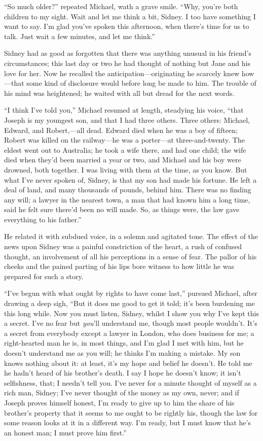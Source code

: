 ``So much older?'' repeated Michael, wath a grave smile. ``Why, you're
both children to my sight. Wait and let me think a bit, Sidney. I too
have something I want to say. I'm glad you've spoken this afternoon,
when there's time for us to talk. Just wait a few minutes, and let me
think.''

{\protect\hypertarget{126}{}{}}Sidney had as good as forgotten that
there was anything unusual in his friend's circumstances; this last day
or two he had thought of nothing but Jane and his love for her. Now he
recalled the anticipation---originating he scarcely knew how---that some
kind of disclosure would before long be made to him. The trouble of his
mind was heightened; he waited with all but dread for the next words.

``I think I've told you,'' Michael resumed at length, steadying his
voice, ``that Joseph is my youngest son, and that I had three others.
Three others: Michael, Edward, and Robert,---all dead. Edward died when
he was a boy of fifteen; Robert was killed on the railway---he was a
porter---at three-and-twenty. The eldest went out to Australia; he took
a wife there, and had one child; the wife died when they'd been married
a year or two, and Michael and his boy were drowned, both together. I
was living with them at the time, as you know. But what I've never
spoken of, Sidney, is that my son had made his fortune. He left a deal
of land, and many thousands of {\protect\hypertarget{127}{}{}}pounds,
behind him. There was no finding any will; a lawyer in the nearest town,
a man that had known him a long time, said he felt sure there'd been no
will made. So, as things were, the law gave everything to his father.''

He related it with subdued voice, in a solemn and agitated tone. The
effect of the news upon Sidney was a painful constriction of the heart,
a rush of confused thought, an involvement of all his perceptions in a
sense of fear. The pallor of his cheeks and the pained parting of his
lips bore witness to how little he was prepared for such a story.

``I've begun with what ought by rights to have come last,'' pursued
Michael, after drawing a deep sigh, ``But it does me good to get it
told; it's been burdening me this long while. Now you must listen,
Sidney, whilst I show you why I've kept this a secret. I've no fear but
\emph{you}'ll understand me, though most people wouldn't. It's a secret
from everybody except a lawyer in London, who does business for me; a
right-hearted man {\protect\hypertarget{128}{}{}}he is, in most things,
and I'm glad I met with him, but he doesn't understand me as you will;
he thinks I'm making a mistake. My son knows nothing about it: at least,
it's my hope and belief he doesn't. He told me he hadn't heard of his
brother's death. I say I hope he doesn't know; it isn't selfishness,
that; I needn't tell you. I've never for a minute thought of myself as a
rich man, Sidney; I've never thought of the money as my own, never; and
if Joseph proves himself honest, I'm ready to give up to him the share
of his brother's property that it seems to me ought to be rightly his,
though the law for some reason looks at it in a different way. I'm
ready, but I must know that he's an honest man; I must prove him
first.''

